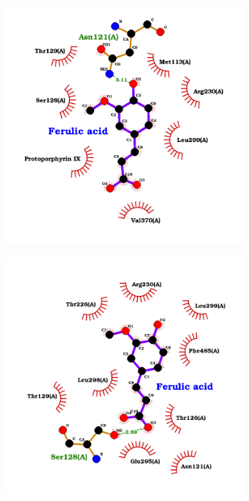 \documentclass[12pt]{article}
\begin{document}
\begin{figure}[h!]
\begin{subfigure}[h!]{0.35\textwidth}
			\caption{}
		\end{subfigure}
		\hfill
		\begin{subfigure}[h!]{0.35\textwidth}
			\hspace{2cm}
			\includegraphics[width=\textwidth]{../5/propose/Dock/Dock2/best3.png}
			\caption{}
		\end{subfigure}
		\hfill
		\begin{subfigure}[h!]{0.35\textwidth}
			\hspace{-2cm}
			\includegraphics[width=\textwidth]{../5/propose/Dock/Dock2/best4.png}

\end{subfigure}
\end{figure}
\end{document}
